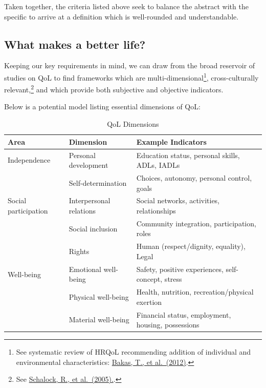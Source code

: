 \documentclass[
]{book}
\begin{document}
Taken together, the criteria listed above seek to balance the abstract with the specific to arrive at a definition which is well-rounded and understandable.

\hypertarget{what-makes-a-better-life}{%
\subsection{What makes a better life?}\label{what-makes-a-better-life}}

Keeping our key requirements in mind, we can draw from the broad reservoir of studies on QoL to find frameworks which are multi-dimensional\footnote{See systematic review of HRQoL recommending addition of individual and environmental characteristics: \href{https://www.ncbi.nlm.nih.gov/pmc/articles/PMC3548743/}{Bakas, T., et al.~(2012)}.}, cross-culturally relevant,\footnote{See \href{https://www.researchgate.net/profile/Mian_Wang4/publication/7801771_Cross-Cultural_Study_of_Quality_of_Life_Indicators/links/0deec52df448eac34d000000/Cross-Cultural-Study-of-Quality-of-Life-Indicators.pdf}{Schalock, R., et al.~(2005).}.} and which provide both subjective and objective indicators.

Below is a potential model listing essential dimensions of QoL:

\begin{table}

\caption{\label{tab:unnamed-chunk-8}QoL Dimensions}
\centering
\begin{tabular}[t]{l|l|l}
\hline
Area & Dimension & Example Indicators\\
\hline
Independence & Personal development & Education status, personal skills, ADLs, IADLs\\
\hline
 & Self-determination & Choices, autonomy, personal control, goals\\
\hline
Social participation & Interpersonal relations & Social networks, activities, relationships\\
\hline
 & Social inclusion & Community integration, participation, roles\\
\hline
 & Rights & Human (respect/dignity, equality), Legal\\
\hline
Well-being & Emotional well-being & Safety, positive experiences, self-concept, stress\\
\hline
 & Physical well-being & Health, nutrition, recreation/physical exertion\\
\hline
 & Material well-being & Financial status, employment, housing, possessions\\
\hline
\end{tabular}
\end{table}
\end{document}
